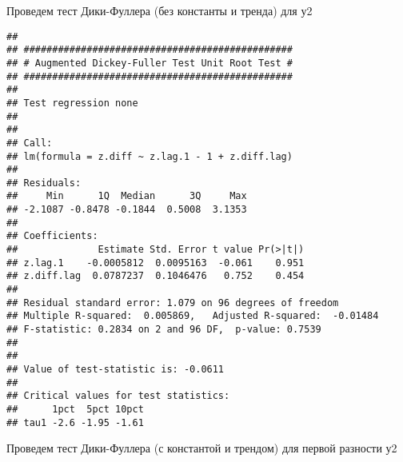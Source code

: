 \documentclass[
]{article}
\newenvironment{Shaded}{\begin{snugshade}}{\end{snugshade}}
\newcommand{\AttributeTok}[1]{\textcolor[rgb]{0.13,0.29,0.53}{#1}}
\newcommand{\FunctionTok}[1]{\textcolor[rgb]{0.13,0.29,0.53}{\textbf{#1}}}
\newcommand{\NormalTok}[1]{#1}
\newcommand{\OtherTok}[1]{\textcolor[rgb]{0.56,0.35,0.01}{#1}}
\newcommand{\SpecialCharTok}[1]{\textcolor[rgb]{0.81,0.36,0.00}{\textbf{#1}}}
\newcommand{\StringTok}[1]{\textcolor[rgb]{0.31,0.60,0.02}{#1}}
\begin{document}
Проведем тест Дики-Фуллера (без константы и тренда) для у2

\begin{Shaded}
\end{Shaded}

\begin{verbatim}
## 
## ############################################### 
## # Augmented Dickey-Fuller Test Unit Root Test # 
## ############################################### 
## 
## Test regression none 
## 
## 
## Call:
## lm(formula = z.diff ~ z.lag.1 - 1 + z.diff.lag)
## 
## Residuals:
##     Min      1Q  Median      3Q     Max 
## -2.1087 -0.8478 -0.1844  0.5008  3.1353 
## 
## Coefficients:
##              Estimate Std. Error t value Pr(>|t|)
## z.lag.1    -0.0005812  0.0095163  -0.061    0.951
## z.diff.lag  0.0787237  0.1046476   0.752    0.454
## 
## Residual standard error: 1.079 on 96 degrees of freedom
## Multiple R-squared:  0.005869,   Adjusted R-squared:  -0.01484 
## F-statistic: 0.2834 on 2 and 96 DF,  p-value: 0.7539
## 
## 
## Value of test-statistic is: -0.0611 
## 
## Critical values for test statistics: 
##      1pct  5pct 10pct
## tau1 -2.6 -1.95 -1.61
\end{verbatim}

Проведем тест Дики-Фуллера (с константой и трендом) для первой разности
у2

\begin{Shaded}
\end{Shaded}
\end{document}

